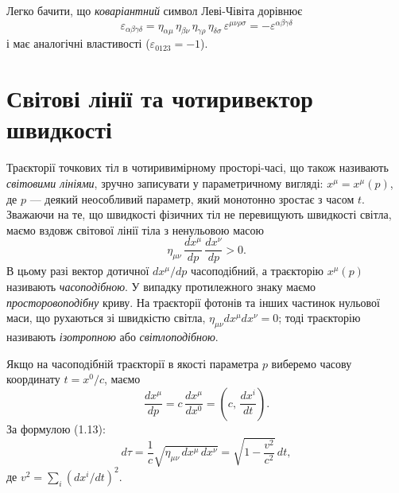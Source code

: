 \documentclass[%
biblatex,
]{ConspectBook}
\begin{document}
Легко бачити, що \textit{коваріантний} символ Леві-Чівіта дорівнює
\begin{equation*}
  \varepsilon_{\alpha\beta\gamma\delta}
  = \eta_{\alpha\mu}\,\eta_{\beta\nu}\,\eta_{\gamma\rho}\,\eta_{\delta\sigma}\,
    \varepsilon^{\mu\nu\rho\sigma}
  = -\varepsilon^{\alpha\beta\gamma\delta}
\end{equation*}
і має аналогічні властивості ($\varepsilon_{0123} = -1$).

\section{Світові лінії та чотиривектор швидкості}

Траєкторії точкових тіл в чотиривимірному просторі-часі, що також
називають \textit{світовими лініями}, зручно записувати у параметричному
вигляді: $x^\mu = x^\mu(p)$, де $p$ --- деякий неособливий параметр,
який монотонно зростає з часом $t$. Зважаючи на те, що швидкості
фізичних тіл не перевищують швидкості світла, маємо вздовж світової
лінії тіла з ненульовою масою
\begin{equation*}
  \eta_{\mu\nu}\,\frac{dx^\mu}{dp}\,\frac{dx^\nu}{dp} > 0.
\end{equation*}
В цьому разі вектор дотичної $dx^\mu/dp$ часоподібний, а траєкторію
$x^\mu(p)$ називають \textit{часоподібною}. У випадку протилежного знаку
маємо \textit{просторовоподібну} криву. На траєкторії фотонів та інших
частинок нульової маси, що рухаються зі швидкістю світла,
$\eta_{\mu\nu}dx^\mu dx^\nu = 0$; тоді траєкторію називають
\textit{ізотропною} або \textit{світлоподібною}.

Якщо на часоподібній траєкторії в якості параметра $p$ виберемо часову
координату $t = x^0/c$, маємо
\[
  \frac{dx^\mu}{dp} = c\,\frac{dx^\mu}{dx^0} = \left(c,\,\frac{dx^i}{dt}\right).
\]
За формулою (1.13):
\[
  d\tau = \frac{1}{c}\sqrt{\eta_{\mu\nu}\,dx^\mu\,dx^\nu}
        = \sqrt{1 - \frac{v^2}{c^2}}\,dt,
\]
де $v^2 = \sum_i (dx^i/dt)^2$.
\end{document}
